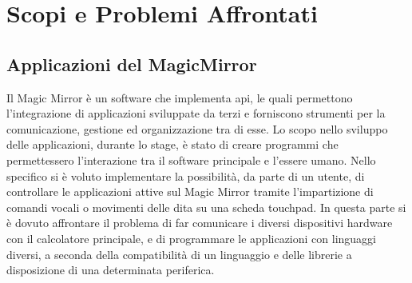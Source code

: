 \chapter{Scopi e Problemi Affrontati}

\section{Applicazioni del MagicMirror}
Il Magic Mirror \`e un software che implementa api, le quali permettono
l'integrazione di applicazioni sviluppate da terzi e forniscono strumenti per la comunicazione, gestione
ed organizzazione tra di esse.
Lo scopo nello sviluppo delle applicazioni, durante lo stage, \`e stato
di creare programmi che permettessero l'interazione tra il software principale
e l'essere umano. Nello specifico si \`e voluto implementare la possibilit\`a, da parte di un utente,
di controllare le applicazioni attive sul Magic Mirror tramite l'impartizione di comandi vocali
o movimenti delle dita su una scheda touchpad.
In questa parte si \`e dovuto affrontare il problema di far comunicare
i diversi dispositivi hardware con il calcolatore principale, e di programmare
le applicazioni con linguaggi diversi, a seconda della compatibilit\`a di un linguaggio
e delle librerie a disposizione di una determinata periferica.
\\[2\baselineskip]
